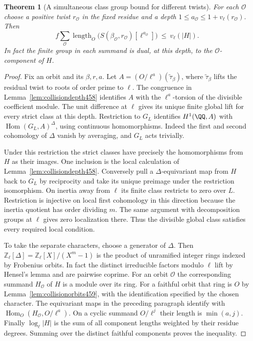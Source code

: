 \documentclass[a4paper,11pt]{article}
\newtheorem{theorem}[proposition]{Theorem}
\theoremstyle{definition}
\theoremstyle{remark}
\newcommand{\ZZ}{\mathbb Z}\newcommand{\ord}{\operatorname{ord}}
\numberwithin{equation}{section}
\begin{document}
\begin{theorem}[A simultaneous class group bound for different twists]\leavevmode
\label{thm:commonorbits459}
For each \(\mathcal O\) choose a positive twist \(r_{\mathcal O}\)
in the fixed residue and a depth
\(1\le a_{\mathcal O}\le 1+v_\ell(r_{\mathcal O})\). Then
\[
   f\sum_{\mathcal O}\operatorname{length}_O
       \bigl(S(\beta_{\mathcal O},r_{\mathcal O})
                            [\ell^{a_{\mathcal O}}]\bigr)
                         \ \le\ v_\ell(|H|).
\]
In fact the finite group in each summand is dual, at this depth,
to the \(\mathcal O\)-component of \(H\).
\end{theorem}
\begin{proof}
Fix an orbit and its \(\beta,r,a\). Let \(A=(O/\ell^a)(\widetilde
\tau_\beta)\), where \(\widetilde\tau_\beta\) lifts the residual
twist to roots of order prime to \(\ell\). The congruence in
Lemma~\ref{lem:collisiondepth458} identifies \(A\) with the
\(\ell^a\)-torsion of the divisible coefficient module. The
unit difference at \(\ell\) gives its unique finite global lift
for every strict class at this depth. Restriction to \(G_L\)
identifies \(H^1(\QQ,A)\) with
\(\operatorname{Hom}(G_L,A)^\Delta\), using continuous
homomorphisms. Indeed the first and second cohomology of
\(\Delta\) vanish by averaging, and \(G_L\) acts trivially.

Under this restriction the strict classes have precisely the
homomorphisms from \(H\) as their images. One inclusion is the
local calculation of Lemma~\ref{lem:collisiondepth458}.
Conversely pull a \(\Delta\)-equivariant map from \(H\) back
to \(G_L\) by reciprocity and take its unique preimage under
the restriction isomorphism. On inertia away from \(\ell\) its finite class
restricts to zero over \(L\). Restriction is injective on local
first cohomology in this direction because the inertia quotient
has order dividing \(m\). The same argument with decomposition
groups at \(\ell\) gives zero localization there. Thus the
divisible global class satisfies every required local condition.

To take the separate characters, choose a generator of \(\Delta\).
Then \(\ZZ_\ell[\Delta]=\ZZ_\ell[X]/(X^m-1)\) is the product of
unramified integer rings indexed by Frobenius orbits. In fact the
distinct irreducible factors modulo \(\ell\) lift by Hensel's
lemma and are pairwise coprime. For an orbit \(\mathcal O\) the
corresponding summand \(H_{\mathcal O}\) of \(H\) is a module
over its ring. For a faithful orbit that ring is \(O\) by
Lemma~\ref{lem:collisionorbits459}, with the identification
specified by the chosen character. The equivariant maps in the
preceding paragraph identify with
\(\operatorname{Hom}_O(H_{\mathcal O},O/\ell^a)\). On a cyclic
summand \(O/\ell^j\) their length is \(\min(a,j)\). Finally
\(\log_\ell |H|\) is the sum of all component lengths weighted
by their residue degrees. Summing over the distinct faithful
components proves the inequality.
\end{proof}
\end{document}
